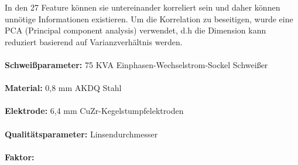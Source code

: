 \documentclass[english,ngerman]{tudscrreprt}
\begin{document}
In den 27 Feature können sie untereinander korreliert sein und daher können unnötige Informationen existieren. Um die Korrelation zu beseitigen, wurde eine PCA (Principal component  analysis) verwendet, d.h die Dimension kann reduziert basierend auf Varianzverhältnis werden.\\
\\
\textbf{Schweißparameter: }75 KVA Einphasen-Wechselstrom-Sockel Schweißer\\
\\
\textbf{Material: }0,8 mm AKDQ Stahl\\
\\
\textbf{Elektrode: }6,4 mm CuZr-Kegelstumpfelektroden\\
\\
\textbf{Qualitätsparameter: }Linsendurchmesser\\
\\
\textbf{Faktor: }
\end{document}

